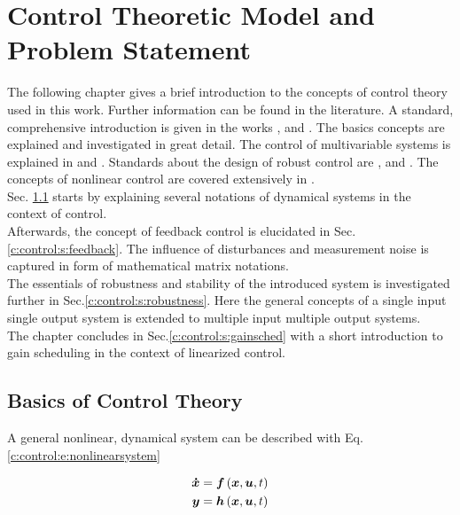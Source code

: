 \chapter{Control Theoretic Model and Problem Statement}\label{c:control}

The following chapter gives a brief introduction to the concepts of control theory used in this work. Further information can be found in the literature. A standard, comprehensive introduction is given in the works \cite{Lunze2016},\cite{Lunze2014} and \cite{Astrom2009}. The basics concepts are explained and investigated in great detail. The control of multivariable systems is explained in \cite{Skogestad2005} and \cite{Glad2000}. Standards about the design of robust control are \cite{Zhou1998}, \cite{Zhou1996} and \cite{Doyle}. The concepts of nonlinear control are covered extensively in \cite{Adamy2014}.\\

Sec. \ref{c:control:s:basics} starts by explaining several notations of dynamical systems in the context of control.\\

Afterwards, the concept of feedback control is elucidated in Sec. \ref{c:control:s:feedback}. The influence of disturbances and measurement noise is captured in form of mathematical matrix notations.\\

The essentials of robustness and stability of the introduced system is investigated further in Sec.\ref{c:control:s:robustness}. Here the general concepts of a single input single output system is extended to multiple input multiple output systems.\\

The chapter concludes in Sec.\ref{c:control:s:gainsched} with a short introduction to gain scheduling in the context of linearized control. 

\section{Basics of Control Theory}\label{c:control:s:basics}

A general nonlinear, dynamical system can be described with Eq. \ref{c:control:e:nonlinearsystem} \cite{Adamy2014}

\begin{align}
\begin{split}
\mbox{\boldmath$\dot{x}$} &= \mbox{\boldmath$f$}\left(\mbox{\boldmath$x$},\mbox{\boldmath$u$}, t\right) \\
\mbox{\boldmath$y$} &= \mbox{\boldmath$h$}\left(\mbox{\boldmath$x$},\mbox{\boldmath$u$},t \right)
\end{split}
\label{c:control:e:nonlinearsystem}
\end{align}


